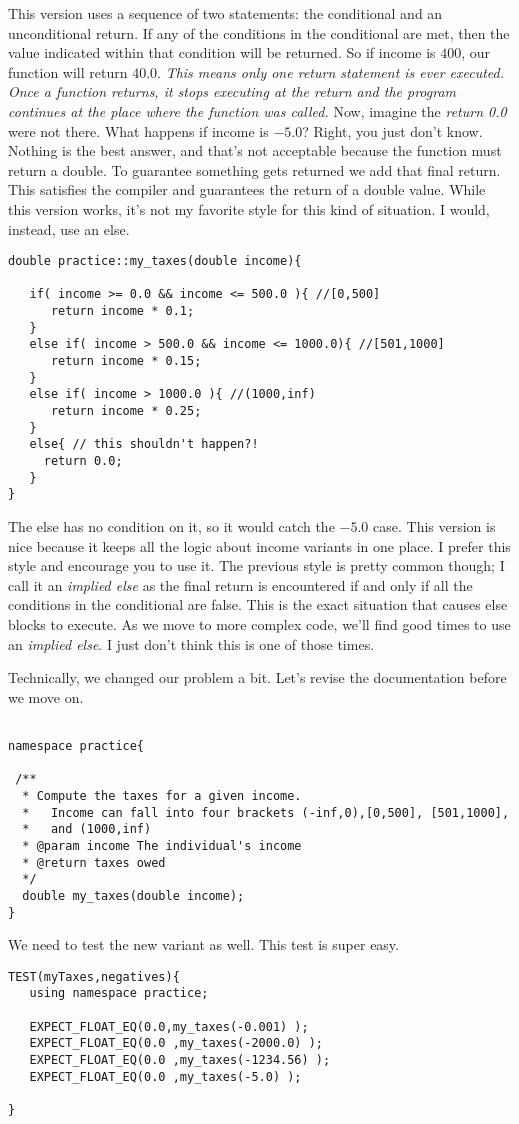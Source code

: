 \documentclass[]{tufte-handout}
\begin{document}
This version uses a sequence of two statements: the conditional and an unconditional return.  If any of the conditions in the conditional are met, then the value indicated within that condition will be returned. So if income is $400$, our function will return $40.0$. \textit{This means only one return statement is ever executed. Once a function returns, it stops executing at the return and the program continues at the place where the function was called.}  Now, imagine the \textit{return 0.0} were not there. What happens if income is $-5.0$? Right, you just don't know. Nothing is the best answer, and that's not acceptable because the function must return a double. To guarantee something gets returned we add that final return. This satisfies the compiler and guarantees the return of a double value.  While this version works, it's not my favorite style for this kind of situation. I would, instead, use an else.
\begin{verbatim}
double practice::my_taxes(double income){

   if( income >= 0.0 && income <= 500.0 ){ //[0,500]
      return income * 0.1;
   }
   else if( income > 500.0 && income <= 1000.0){ //[501,1000]
      return income * 0.15;   
   }
   else if( income > 1000.0 ){ //(1000,inf) 
      return income * 0.25;   
   }
   else{ // this shouldn't happen?!
     return 0.0;
   }  
}
\end{verbatim}

The else has no condition on it, so it would catch the $-5.0$ case. This version is nice because it keeps all the logic about income variants in one place. I prefer this style and encourage you to use it. The previous style is pretty common though; I call it an \textit{implied else} as the final return is encountered if and only if all the conditions in the conditional are false. This is the exact situation that causes else blocks to execute. As we move to more complex code, we'll find good times to use an \textit{implied else}. I just don't think this is one of those times. 

Technically, we changed our problem a bit. Let's revise the documentation before we move on.
\begin{verbatim}

namespace practice{

 /** 
  * Compute the taxes for a given income.
  *   Income can fall into four brackets (-inf,0),[0,500], [501,1000], 
  *   and (1000,inf)
  * @param income The individual's income 
  * @return taxes owed
  */
  double my_taxes(double income);
}
\end{verbatim}
We need to test the new variant as well. This test is super easy.
\begin{verbatim}
TEST(myTaxes,negatives){
   using namespace practice;

   EXPECT_FLOAT_EQ(0.0,my_taxes(-0.001) );  
   EXPECT_FLOAT_EQ(0.0 ,my_taxes(-2000.0) );
   EXPECT_FLOAT_EQ(0.0 ,my_taxes(-1234.56) );
   EXPECT_FLOAT_EQ(0.0 ,my_taxes(-5.0) );      
   
}
\end{verbatim}
\end{document}
